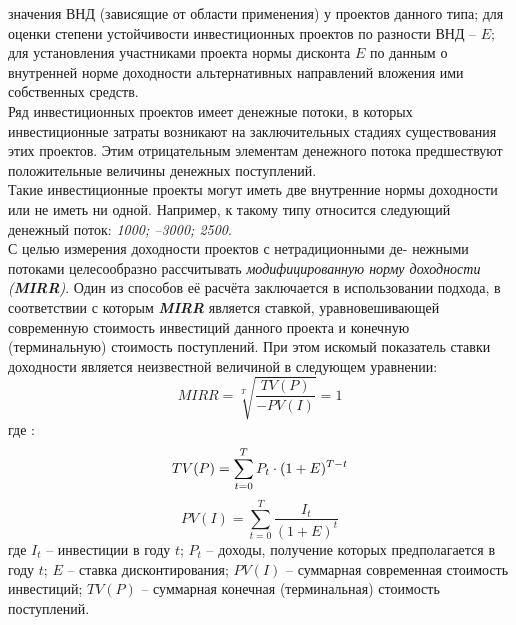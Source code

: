 \documentclass[a4paper,12pt]{article}
\begin{document}
значения ВНД (зависящие от области применения) у проектов данного типа; для оценки степени устойчивости инвестиционных проектов по разности ВНД – ${E}$; для установления участниками проекта нормы дисконта ${E}$
по данным о внутренней норме доходности альтернативных направлений
вложения ими собственных средств.\\
Ряд инвестиционных проектов имеет денежные потоки, в которых
инвестиционные затраты возникают на заключительных стадиях существования этих проектов. Этим отрицательным элементам денежного потока
предшествуют положительные величины денежных поступлений.\\
Такие инвестиционные проекты могут иметь две внутренние нормы
доходности или не иметь ни одной. Например, к такому типу относится
следующий денежный поток: \textit{1000; –3000; 2500}.\\
С целью измерения доходности проектов с нетрадиционными де-
нежными потоками целесообразно рассчитывать \textit{модифицированную
норму доходности} \textit{(\textbf{MIRR})}.
Один из способов её расчёта заключается в использовании подхода,
в соответствии с которым \textit{\textbf{MIRR}} является ставкой, уравновешивающей современную стоимость инвестиций данного проекта и конечную (терминальную) стоимость поступлений. При этом искомый показатель ставки
доходности является неизвестной величиной в следующем уравнении:
\begin{equation}
	MIRR = \sqrt[T]{\frac{TV(P)}{-PV(I)}}=1
\end{equation}
где :
\begin{equation}
	TV(P) = \sum_{t=0}^ T P_t \cdot {(1+E)^{T-t}}\\
\end{equation}
\begin{equation}
	PV(I) = \sum_{t=0}^ T \frac{I_t}{(1+E)^t}
\end{equation}
где ${I_t}$ – инвестиции в году ${t}$; ${P_t}$ – доходы, получение которых предполагается в году ${t}$; ${E}$ – ставка дисконтирования; ${PV(I)}$ – суммарная современная стоимость инвестиций; ${TV(P)}$ – суммарная конечная (терминальная) стоимость поступлений.\\\medskip
\end{document}
